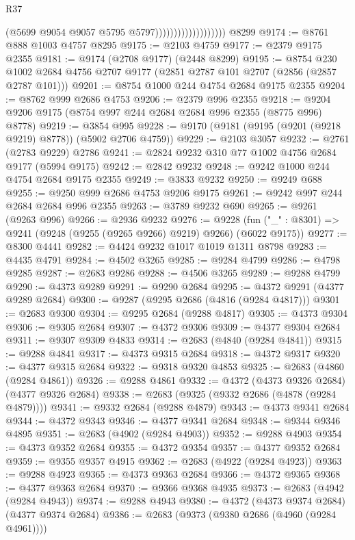 \begin{lexlean}{R37}
\begin{coremodule}
                                        (@5699 @9054 @9057 @5795 @5797)))))))))))))))))))
    @8299
@9174 := @8761 @888 @1003 @4757 @8295
@9175 := @2103 @4759
@9177 := @2379 @9175 @2355
@9181 := @9174 (@2708 @9177) (@2448 @8299)
@9195 := @8754
    @230
    @1002
    @2684
    @4756
    @2707
    @9177
    (@2851 @2787 @101 @2707 (@2856 (@2857 @2787 @101)))
@9201 := @8754 @1000 @244 @4754 @2684 @9175 @2355
@9204 := @8762 @999 @2686 @4753
@9206 := @2379 @996 @2355
@9218 := @9204 @9206 @9175 (@8754 @997 @244 @2684 @2684 @996 @2355 (@8775 @996) @8778)
@9219 := @3854 @995
@9228 := @9170 (@9181 (@9195 (@9201 (@9218 @9219) @8778)) (@5902 @2706 @4759))
@9229 := @2103 @3057
@9232 := @2761 (@2783 @9229) @2786
@9241 := @2824 @9232 @310 @77 @1002 @4756 @2684 @9177 (@5994 @9175)
@9242 := @2842 @9232
@9248 := @9242 @1000 @244 @4754 @2684 @9175 @2355
@9249 := @3833 @9232
@9250 := @9249 @688
@9255 := @9250 @999 @2686 @4753 @9206 @9175
@9261 := @9242 @997 @244 @2684 @2684 @996 @2355
@9263 := @3789 @9232 @690
@9265 := @9261 (@9263 @996)
@9266 := @2936 @9232
@9276 := @9228 (fun ("_" : @8301) => @9241 (@9248 (@9255 (@9265 @9266) @9219) @9266) (@6022 @9175))
@9277 := @8300 @4441
@9282 := @4424 @9232 @1017 @1019 @1311 @8798
@9283 := @4435 @4791
@9284 := @4502 @3265
@9285 := @9284 @4799
@9286 := @4798 @9285
@9287 := @2683 @9286
@9288 := @4506 @3265
@9289 := @9288 @4799
@9290 := @4373 @9289
@9291 := @9290 @2684
@9295 := @4372 @9291 (@4377 @9289 @2684)
@9300 := @9287 (@9295 @2686 (@4816 (@9284 @4817)))
@9301 := @2683 @9300
@9304 := @9295 @2684 (@9288 @4817)
@9305 := @4373 @9304
@9306 := @9305 @2684
@9307 := @4372 @9306
@9309 := @4377 @9304 @2684
@9311 := @9307 @9309 @4833
@9314 := @2683 (@4840 (@9284 @4841))
@9315 := @9288 @4841
@9317 := @4373 @9315 @2684
@9318 := @4372 @9317
@9320 := @4377 @9315 @2684
@9322 := @9318 @9320 @4853
@9325 := @2683 (@4860 (@9284 @4861))
@9326 := @9288 @4861
@9332 := @4372 (@4373 @9326 @2684) (@4377 @9326 @2684)
@9338 := @2683 (@9325 (@9332 @2686 (@4878 (@9284 @4879))))
@9341 := @9332 @2684 (@9288 @4879)
@9343 := @4373 @9341 @2684
@9344 := @4372 @9343
@9346 := @4377 @9341 @2684
@9348 := @9344 @9346 @4895
@9351 := @2683 (@4902 (@9284 @4903))
@9352 := @9288 @4903
@9354 := @4373 @9352 @2684
@9355 := @4372 @9354
@9357 := @4377 @9352 @2684
@9359 := @9355 @9357 @4915
@9362 := @2683 (@4922 (@9284 @4923))
@9363 := @9288 @4923
@9365 := @4373 @9363 @2684
@9366 := @4372 @9365
@9368 := @4377 @9363 @2684
@9370 := @9366 @9368 @4935
@9373 := @2683 (@4942 (@9284 @4943))
@9374 := @9288 @4943
@9380 := @4372 (@4373 @9374 @2684) (@4377 @9374 @2684)
@9386 := @2683 (@9373 (@9380 @2686 (@4960 (@9284 @4961))))

\end{coremodule}
\end{lexlean}
